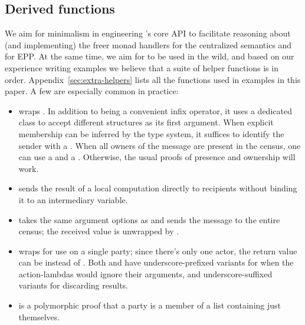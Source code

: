 \subsection{Derived functions}\label{sec:helpers}
We aim for minimalism in engineering \MultiChor's core API to facilitate reasoning about
(and implementing) the freer monad handlers for the centralized semantics and for EPP.
At the same time, we aim for \MultiChor to be used in the wild,
and based on our experience writing examples
we believe that a suite of helper functions is in order.
Appendix~\ref{sec:extra-helpers} lists all the functions used in examples in this paper.
A few are especially common in practice:
\begin{itemize}%
    \item \inlinecode{~>} wraps .
          In addition to being a convenient infix operator,
          it uses a dedicated class to accept different structures as its first argument.
          When explicit membership can be inferred by the type system,
          it suffices to identify the sender with a .
          When all owners of the message are present in the census,
          one can use a  and a .
          Otherwise, the usual proofs of presence and ownership will work.
    \item \inlinecode{~~>} sends the result of a local computation directly to recipients
          without binding it to an intermediary variable.
    \item {} takes the same argument options as \inlinecode{~>}
          and sends the message to the entire census;
          the received value is unwrapped by .
    \item {} wraps  for use on a single party;
          since there's only one actor, the return value can be 
          instead of .
          Both  and  have underscore-prefixed
          variants for when the action-lambdas would ignore their arguments,
          and underscore-suffixed variants for discarding  results.
    \item {} is a polymorphic proof that a party is a member of a list
          containing just themselves. 
\end{itemize}



